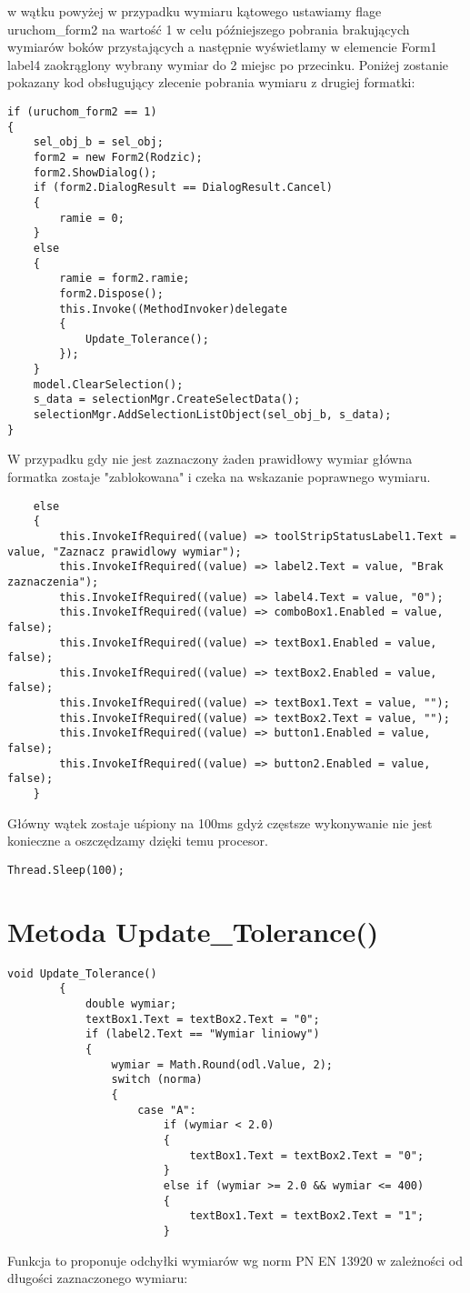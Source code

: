 \documentclass[11pt,a4paper]{article}
\begin{document}
\newpage
w wątku powyżej w przypadku wymiaru kątowego ustawiamy 
flage uruchom\_form2 na wartość 1 w celu późniejszego
 pobrania brakujących wymiarów boków przystających a 
 następnie wyświetlamy w elemencie Form1 label4 
 zaokrąglony wybrany wymiar do 2 miejsc po przecinku.
 Poniżej zostanie pokazany kod obsługujący zlecenie pobrania wymiaru z drugiej formatki:
\begin{lstlisting}
if (uruchom_form2 == 1)
{
	sel_obj_b = sel_obj;
	form2 = new Form2(Rodzic);
	form2.ShowDialog();
	if (form2.DialogResult == DialogResult.Cancel)
	{
		ramie = 0;
	}
	else
	{
		ramie = form2.ramie;
		form2.Dispose();
		this.Invoke((MethodInvoker)delegate
		{
			Update_Tolerance();
		});
	}
	model.ClearSelection();
	s_data = selectionMgr.CreateSelectData();
	selectionMgr.AddSelectionListObject(sel_obj_b, s_data);
}
\end{lstlisting}
W przypadku gdy nie jest zaznaczony żaden prawidłowy wymiar główna formatka zostaje "zablokowana" i czeka na wskazanie poprawnego wymiaru.
\begin{lstlisting}
	else
	{
		this.InvokeIfRequired((value) => toolStripStatusLabel1.Text = value, "Zaznacz prawidlowy wymiar");
		this.InvokeIfRequired((value) => label2.Text = value, "Brak zaznaczenia");
		this.InvokeIfRequired((value) => label4.Text = value, "0");
		this.InvokeIfRequired((value) => comboBox1.Enabled = value, false);
		this.InvokeIfRequired((value) => textBox1.Enabled = value, false);
		this.InvokeIfRequired((value) => textBox2.Enabled = value, false);
		this.InvokeIfRequired((value) => textBox1.Text = value, "");
		this.InvokeIfRequired((value) => textBox2.Text = value, "");
		this.InvokeIfRequired((value) => button1.Enabled = value, false);
		this.InvokeIfRequired((value) => button2.Enabled = value, false);
	}
\end{lstlisting}
Główny wątek zostaje uśpiony na 100ms gdyż częstsze wykonywanie nie jest konieczne a oszczędzamy dzięki temu procesor.
\begin{lstlisting}
Thread.Sleep(100);
\end{lstlisting}
\newpage
{}
\section*{Metoda Update\_Tolerance()}
\begin{lstlisting}
void Update_Tolerance()
        {
            double wymiar;
            textBox1.Text = textBox2.Text = "0";
            if (label2.Text == "Wymiar liniowy")
            {
                wymiar = Math.Round(odl.Value, 2);
                switch (norma)
                {
                    case "A":
                        if (wymiar < 2.0)
                        {
                            textBox1.Text = textBox2.Text = "0";
                        }
                        else if (wymiar >= 2.0 && wymiar <= 400)
                        {
                            textBox1.Text = textBox2.Text = "1";
                        }
\end{lstlisting}
Funkcja to proponuje odchyłki wymiarów wg norm PN EN 13920 w zależności od długości zaznaczonego wymiaru:
\newpage
\end{document}
